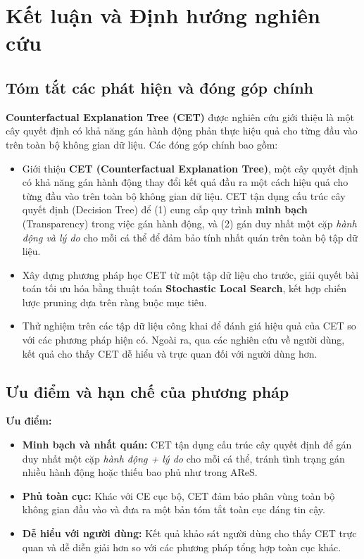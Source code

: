 \chapter{Kết luận và Định hướng nghiên cứu}

\section{Tóm tắt các phát hiện và đóng góp chính}
\textbf{Counterfactual Explanation Tree (CET)} được nghiên cứu giới thiệu là một cây quyết định có khả năng gán hành động phản thực hiệu quả cho từng đầu vào trên toàn bộ không gian dữ liệu. Các đóng góp chính bao gồm:
\begin{itemize}
    \item Giới thiệu \textbf{CET (Counterfactual Explanation Tree)}, một cây quyết định có khả năng gán hành động thay đổi kết quả đầu ra một cách hiệu quả cho từng đầu vào trên toàn bộ không gian dữ liệu. CET tận dụng cấu trúc cây quyết định (Decision Tree) để (1) cung cấp quy trình \textbf{minh bạch} (Transparency) trong việc gán hành động, và (2) gán duy nhất một cặp \textit{hành động và lý do} cho mỗi cá thể để đảm bảo tính nhất quán trên toàn bộ tập dữ liệu.
    
    \item Xây dựng phương pháp học CET từ một tập dữ liệu cho trước, giải quyết bài toán tối ưu hóa bằng thuật toán \textbf{Stochastic Local Search}, kết hợp chiến lược pruning dựa trên ràng buộc mục tiêu.
    
    \item Thử nghiệm trên các tập dữ liệu công khai để đánh giá hiệu quả của CET so với các phương pháp hiện có. Ngoài ra, qua các nghiên cứu về người dùng, kết quả cho thấy CET dễ hiểu và trực quan đối với người dùng hơn.
\end{itemize}


\section{Ưu điểm và hạn chế của phương pháp}

\textbf{Ưu điểm:}
\begin{itemize}
    \item \textbf{Minh bạch và nhất quán:} CET tận dụng cấu trúc cây quyết định để gán duy nhất một cặp \textit{hành động + lý do} cho mỗi cá thể, tránh tình trạng gán nhiều hành động hoặc thiếu bao phủ như trong AReS.
    \item \textbf{Phủ toàn cục:} Khác với CE cục bộ, CET đảm bảo phân vùng toàn bộ không gian đầu vào và đưa ra một bản tóm tắt toàn cục đáng tin cậy.
    \item \textbf{Dễ hiểu với người dùng:} Kết quả khảo sát người dùng cho thấy CET trực quan và dễ diễn giải hơn so với các phương pháp tổng hợp toàn cục khác.
\end{itemize}

